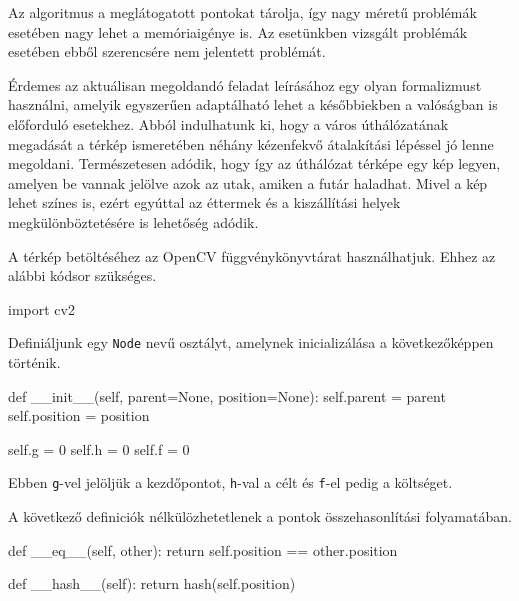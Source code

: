 Az algoritmus a meglátogatott pontokat tárolja, így nagy méretű problémák esetében nagy lehet a memóriaigénye is.
Az esetünkben vizsgált problémák esetében ebből szerencsére nem jelentett problémát. 


Érdemes az aktuálisan megoldandó feladat leírásához egy olyan formalizmust használni, amelyik egyszerűen adaptálható lehet a későbbiekben a valóságban is előforduló esetekhez.
Abból indulhatunk ki, hogy a város úthálózatának megadását a térkép ismeretében néhány kézenfekvő átalakítási lépéssel jó lenne megoldani.
Természetesen adódik, hogy így az úthálózat térképe egy kép legyen, amelyen be vannak jelölve azok az utak, amiken a futár haladhat.
Mivel a kép lehet színes is, ezért egyúttal az éttermek és a kiszállítási helyek megkülönböztetésére is lehetőség adódik.

A térkép betöltéséhez az OpenCV függvénykönyvtárat használhatjuk.\cite{PythonOpenCV}
Ehhez az alábbi kódsor szükséges.
\begin{python}
import cv2
\end{python}

Definiáljunk egy \texttt{Node} nevű osztályt, amelynek inicializálása a következőképpen történik.\cite{Python}
\begin{python}
def __init__(self, parent=None, position=None):
    self.parent = parent
    self.position = position

    self.g = 0
    self.h = 0
    self.f = 0
\end{python}
Ebben \texttt{g}-vel jelöljük a kezdőpontot, \texttt{h}-val a célt és \texttt{f}-el pedig a költséget.

A következő definiciók nélkülözhetetlenek a pontok összehasonlítási folyamatában.

\begin{python}
def __eq__(self, other):
    return self.position == other.position

def __hash__(self):
    return hash(self.position)
\end{python}

